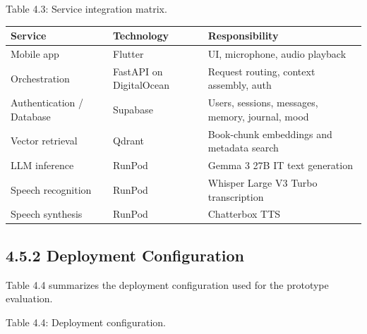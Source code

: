 \documentclass[
  letterpaper,
  12pt,
  a4paper,
  openany]{report}
\newcounter{none} %
\begin{document}
Table 4.3: Service integration matrix.

{\def\LTcaptype{none} %
\begin{longtable}[]{@{}
  >{\raggedright\arraybackslash}p{}
  >{\raggedright\arraybackslash}p{}
  >{\raggedright\arraybackslash}p{}@{}}
\toprule\noalign{}
\begin{minipage}[b]{\linewidth}\raggedright
Service
\end{minipage} & \begin{minipage}[b]{\linewidth}\raggedright
Technology
\end{minipage} & \begin{minipage}[b]{\linewidth}\raggedright
Responsibility
\end{minipage} \\
\midrule\noalign{}
\endhead
\bottomrule\noalign{}
\endlastfoot
Mobile app & Flutter & UI, microphone, audio playback \\
Orchestration & FastAPI on DigitalOcean & Request routing, context
assembly, auth \\
Authentication / Database & Supabase & Users, sessions, messages,
memory, journal, mood \\
Vector retrieval & Qdrant & Book-chunk embeddings and metadata search \\
LLM inference & RunPod & Gemma 3 27B IT text generation \\
Speech recognition & RunPod & Whisper Large V3 Turbo transcription \\
Speech synthesis & RunPod & Chatterbox TTS \\
\end{longtable}
}

\subsection{4.5.2 Deployment
Configuration}\label{deployment-configuration}

Table 4.4 summarizes the deployment configuration used for the prototype
evaluation.

Table 4.4: Deployment configuration.
\end{document}
